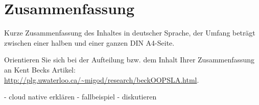 \chapter*{Zusammenfassung}
Kurze Zusammenfassung des Inhaltes in deutscher Sprache, der Umfang beträgt zwischen einer halben und einer ganzen DIN A4-Seite.

Orientieren Sie sich bei der Aufteilung bzw. dem Inhalt Ihrer Zusammenfassung an Kent Becks Artikel: \url{http://plg.uwaterloo.ca/~migod/research/beckOOPSLA.html}.

- cloud native erklären
- fallbeispiel
- diskutieren